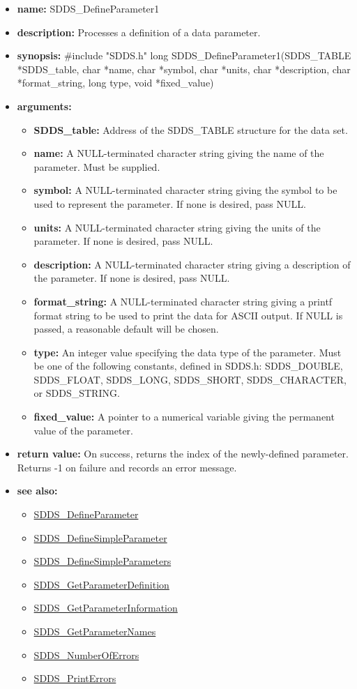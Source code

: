 \documentclass[11pt]{article}
\newcommand{\progref}[1]{\hyperref{SDDS_#1}{{\tt SDDS\_#1} (}{)}{SDDS_#1}}
\begin{document}
\begin{itemize}
\item {\bf name:}\newline
SDDS\_DefineParameter1
\item {\bf description:}\newline
Processes a definition of a data parameter.
\item {\bf synopsis:} \#include "SDDS.h"\newline
long SDDS\_DefineParameter1(SDDS\_TABLE *SDDS\_table, char *name, char *symbol, char *units, char *description, char *format\_string, long type, void *fixed\_value)
\item {\bf arguments:}
\begin{itemize}
\item {\bf SDDS\_table:} Address of the SDDS\_TABLE structure for the data set.
\item {\bf name:} A NULL-terminated character string giving the name of the parameter. Must be supplied.
\item {\bf symbol:} A NULL-terminated character string giving the symbol to be used to represent the parameter. If none is desired, pass NULL.
\item {\bf units:} A NULL-terminated character string giving the units of the parameter. If none is desired, pass NULL.
\item {\bf description:} A NULL-terminated character string giving a description of the parameter. If none is desired, pass NULL.
\item {\bf format\_string:} A NULL-terminated character string giving a  printf format string to be used to print the data for ASCII output. If NULL is passed, a reasonable default will be chosen.
\item {\bf type:} An integer value specifying the data type of the parameter. Must be one of the following constants, defined in  SDDS.h: SDDS\_DOUBLE, SDDS\_FLOAT, SDDS\_LONG, SDDS\_SHORT, SDDS\_CHARACTER, or SDDS\_STRING.
\item {\bf fixed\_value:} A pointer to a numerical variable giving the permanent value of the parameter.
\end{itemize}
\item {\bf return value:}\newline
On success, returns the index of the newly-defined parameter. Returns -1 on failure and records an error message.
\item {\bf see also:}
\begin{itemize}
\item \progref{DefineParameter}
\item \progref{DefineSimpleParameter}
\item \progref{DefineSimpleParameters}
\item \progref{GetParameterDefinition}
\item \progref{GetParameterInformation}
\item \progref{GetParameterNames}
\item \progref{NumberOfErrors}
\item \progref{PrintErrors}
\end{itemize}
\end{itemize}
\end{document}
